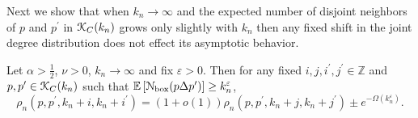 Next we show that when $k_n \to \infty$ and the expected number of disjoint neighbors of $p$ and $p^\prime$ in ${\mathcal K}_{C}(k_n)$ grows only slightly with $k_n$ then any fixed shift in the joint degree distribution does not effect its asymptotic behavior. 


\begin{lemma}\label{lem:joint_degree_distribution_shift}
Let $\alpha > \frac{1}{2}$, $\nu > 0$, $k_n \to \infty$ and fix $\varepsilon > 0$. Then for any fixed $i, j, i^\prime, j^\prime \in \mathbb{Z}$ and $p, p^\prime \in {\mathcal K}_{C}(k_n)$ such that $\mathbb{E}\left[{\mathcal N}_{\text{box}}(p \Delta p^\prime)\right] \ge k_n^\varepsilon$,
\[
	\rho_n(p,p^\prime,k_n + i,k_n + i^\prime) 
	= (1 + o(1))\rho_n(p,p^\prime, k_n + j,k_n + j^\prime)  \pm e^{-\Omega(k_n^\varepsilon)}.
\]
\end{lemma}

